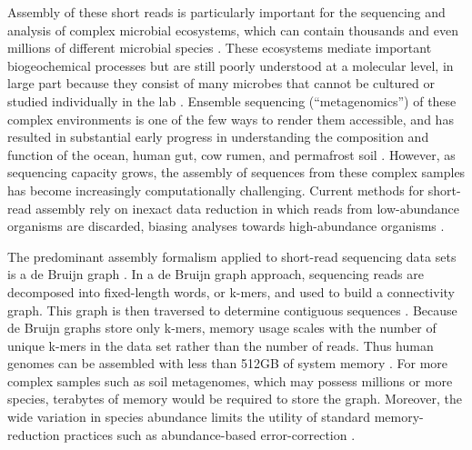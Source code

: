 \documentclass{pnastwo}
\begin{document}
\begin{article}
Assembly of these short reads is particularly important for the sequencing
and analysis of complex microbial ecosystems, which can contain
thousands and even millions of different microbial species \cite{pubmed20195499,pubmed16123304}.  These
ecosystems mediate important biogeochemical processes but are still
poorly understood at a molecular level, in large part because they
consist of many microbes that cannot be cultured or studied
individually in the lab \cite{pubmed20195499}.  Ensemble sequencing (``metagenomics'') of
these complex environments is one of the few ways to render them
accessible, and has resulted in substantial early progress in
understanding the composition and function of the ocean, human gut, cow
rumen, and permafrost soil \cite{metahit,rumen,sargasso,permafrost}.  However, as sequencing capacity grows,
the assembly of sequences from these complex samples has become
increasingly computationally challenging.  Current methods for short-read assembly rely on
inexact data reduction in which reads from low-abundance organisms are
discarded, biasing analyses towards high-abundance organisms \cite{metahit,rumen,permafrost}.

The predominant assembly formalism applied to short-read sequencing
data sets is a de Bruijn graph \cite{pubmed11504945,pubmed20211242,pubmed22068540}.
In a de Bruijn graph approach, sequencing reads are decomposed into
fixed-length words, or k-mers, and used to build a connectivity graph.
This graph is then traversed to determine contiguous sequences
\cite{pubmed22068540}.  Because de Bruijn graphs store only k-mers,
memory usage scales with the number of unique k-mers in the data set
rather than the number of reads.  Thus human genomes can be assembled
with less than 512GB of system memory \cite{pmid21187386}.  For more
complex samples such as soil metagenomes, which may possess millions
or more species, terabytes of memory would be required to store the graph.  Moreover, the wide variation in species abundance
limits the utility of standard memory-reduction practices such as
abundance-based error-correction \cite{pubmed21114842}.


\end{article}
\end{document}
